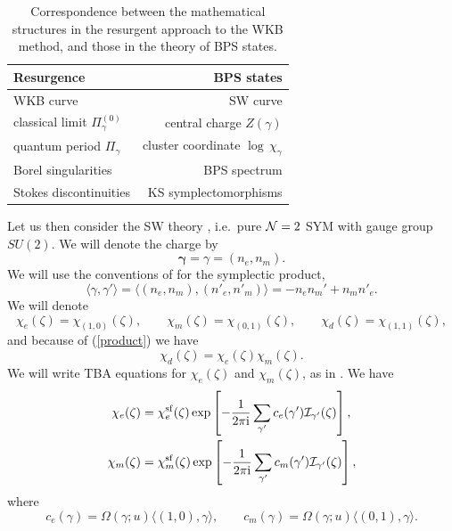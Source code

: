 \documentclass[a4paper,11pt]{article}
\theoremstyle{definition}
\newcommand{\CI}{{\cal I}}
\newcommand{\CN}{{\cal N}}
\newcommand{\ri}{{\rm i}}
\newcommand{\bs}{\boldsymbol}
\newcommand{\ba}{\begin{aligned}}
\newcommand{\ea}{\end{aligned}}
\begin{document}
\begin{table}
\begin{center}
\begin{tabular}{|l | r|}
\hline
Resurgence & BPS states \\ \hline\hline
WKB curve &  SW curve\\ \hline
classical limit $\Pi_\gamma^{(0)}$ & central charge $Z(\gamma)$  \\ \hline
quantum period $\Pi_\gamma$ &  cluster coordinate $\log \, \chi_\gamma$ \\\hline
Borel singularities  & BPS spectrum  \\\hline
Stokes discontinuities  & KS symplectomorphisms  \\\hline
\end{tabular}
\end{center}
\caption{Correspondence between the mathematical structures in the
  resurgent approach to the WKB method, and those in the theory of BPS
  states.}
\label{table-cor}
\end{table}
%


Let us then consider the SW theory \cite{sw}, i.e.\ pure $\CN=2$ SYM with
gauge group $SU(2)$. We will denote the charge by 
%
\begin{equation}
  \bs{\gamma}=\gamma=(n_e, n_m). 
\end{equation}
%
We will use the conventions of \cite{cdorey} for the symplectic product, 
%
\begin{equation}
  \langle \gamma, \gamma'\rangle = \langle (n_e, n_m), (n'_e, n'_m)
  \rangle= -n_e n_m'+ n_m n'_e.  
\end{equation}
%
We will denote
%
\begin{equation}
  \chi_{e} (\zeta)= \chi_{(1,0)} (\zeta), \qquad  \chi_{m} (\zeta)=
  \chi_{(0,1)} (\zeta), \qquad \chi_{d} (\zeta)= \chi_{(1,1)} (\zeta),  
\end{equation}
%
and because of (\ref{product}) we have
%
\begin{equation}
  \chi_{d} (\zeta)= \chi_{e} (\zeta) \chi_{m} (\zeta).
\end{equation}
We will write TBA equations for $ \chi_{e} (\zeta)$ and
$ \chi_{m} (\zeta)$, as in \cite{cdorey}. We have
\begin{equation}
  \label{su2tba}
  \ba
  \chi_e (\zeta)&=  \chi^{\rm sf}_{e} (\zeta)\exp\left[-{1\over 2 \pi
      \ri} \sum_{\gamma'} c_e(\gamma') \CI_{\gamma'}(\zeta) \right],\\ 
  \chi_m (\zeta)&=  \chi^{\rm sf}_{m} (\zeta)\exp\left[-{1\over 2 \pi
      \ri} \sum_{\gamma'} c_m(\gamma') \CI_{\gamma'}(\zeta)\right], 
  \ea
\end{equation}
where
\begin{equation}
  \label{cem}
  c_e(\gamma)= \Omega(\gamma; u) \langle (1,0), \gamma\rangle, \qquad
  c_m(\gamma)= \Omega(\gamma; u) \langle (0,1), \gamma\rangle. 
\end{equation}
\end{document}
